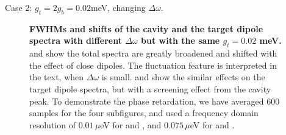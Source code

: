 \documentclass{beamer}
\begin{document}
\begin{frame}{Case 2: $ g_t=2g_b=0.02 $meV, changing $ \Delta\omega $.}
\begin{figure}[htp]
\caption[Modification effect of different $\Delta\omega$ when $g_t=0.02$ meV.]{\textbf{FWHMs and shifts of the cavity and the target dipole spectra with different $\Delta\omega$ but with the same $g_t=0.02$ meV.}  and  show the total spectra are greatly broadened and shifted with the effect of close dipoles. The fluctuation feature is interpreted in the text, when $\Delta\omega$ is small.  and  show the similar effects on the target dipole spectra, but with a screening effect from the cavity peak. To demonstrate the phase retardation, we have averaged 600 samples for the four subfigures, and used a frequency domain resolution of $0.01\,\mu$eV for  and , and $0.075\,\mu$eV for  and . }
\label{fwhm_shift_gt0.02_dw}
\end{figure}
\end{frame}
\end{document}
